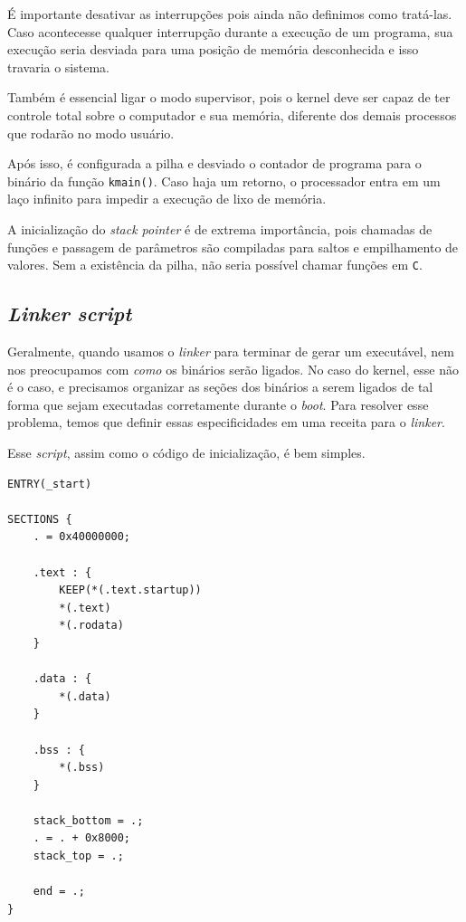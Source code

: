 É importante desativar as interrupções pois ainda não definimos como tratá-las. Caso acontecesse qualquer interrupção durante a execução de um programa, sua execução seria desviada para uma posição de memória desconhecida e isso travaria o sistema.

Também é essencial ligar o modo supervisor, pois o kernel deve ser capaz de ter controle total sobre o computador e sua memória, diferente dos demais processos que rodarão no modo usuário.

Após isso, é configurada a pilha e desviado o contador de programa para o binário da função \verb|kmain()|. Caso haja um retorno, o processador entra em um laço infinito para impedir a execução de lixo de memória.

A inicialização do \textit{stack pointer} é de extrema importância, pois chamadas de funções e passagem de parâmetros são compiladas para saltos e empilhamento de valores. Sem a existência da pilha, não seria possível chamar funções em \verb|C|.

\subsection{\textit{Linker script}}

Geralmente, quando usamos o \textit{linker} para terminar de gerar um executável, nem nos preocupamos com \textit{como} os binários serão ligados. No caso do kernel, esse não é o caso, e precisamos organizar as seções dos binários a serem ligados de tal forma que sejam executadas corretamente durante o \textit{boot}. Para resolver esse problema, temos que definir essas especificidades em uma receita para o \textit{linker}.

Esse \textit{script}, assim como o código de inicialização, é bem simples.

\begin{lstlisting}[language=arm, caption=Script de geração do binário final.]
ENTRY(_start)

SECTIONS {
    . = 0x40000000;

    .text : {
        KEEP(*(.text.startup))
        *(.text)
        *(.rodata)
    }

    .data : {
        *(.data)
    }

    .bss : {
        *(.bss)
    }

    stack_bottom = .;
    . = . + 0x8000;
    stack_top = .;

    end = .;
}
\end{lstlisting}

